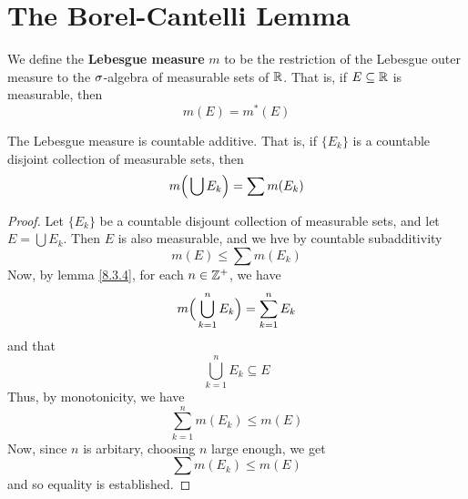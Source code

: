 \section{The Borel-Cantelli Lemma}

\begin{definition}
    We define the \textbf{Lebesgue measure} $m$ to be the restriction of the
    Lebesgue outer measure to the $\sigma$-algebra of measurable sets of $\mathbb{R}$. That
    is, if $E \subseteq \mathbb{R}$ is measurable, then
    \begin{equation*}
        m(E)=m^\ast(E)
    \end{equation*}
\end{definition}

\begin{lemma}\label{8.5.1}
    The Lebesgue measure is countable additive. That is, if $\{E_k\}$ is a
    countable disjoint collection of measurable sets, then
    \begin{equation*}
        m\Big{(} \bigcup{E_k} \Big{)}=\sum{m(E_k)}
    \end{equation*}
\end{lemma}
\begin{proof}
    Let $\{E_k\}$ be a countable disjount collection of measurable sets, and let
    $E=\bigcup{E_k}$. Then $E$ is also measurable, and we hve by countable
    subadditivity
    \begin{equation*}
        m(E) \leq \sum{m(E_k)}
    \end{equation*}
    Now, by lemma \ref{8.3.4}, for each $n \in \mathbb{Z}^+$, we have
    \begin{equation*}
        m\Big{(} \bigcup_{k=1}^n{E_k} \Big{)}=\sum_{k=1}^n{E_k}
    \end{equation*}
    and that
    \begin{equation*}
        \bigcup_{k=1}^n{E_k} \subseteq E
    \end{equation*}
    Thus, by monotonicity, we have
    \begin{equation*}
        \sum_{k=1}^n{m(E_k)} \leq m(E)
    \end{equation*}
    Now, since $n$ is arbitary, choosing  $n$ large enough, we get
    \begin{equation*}
        \sum{m(E_k)} \leq m(E)
    \end{equation*}
    and so equality is established.
\end{proof}


